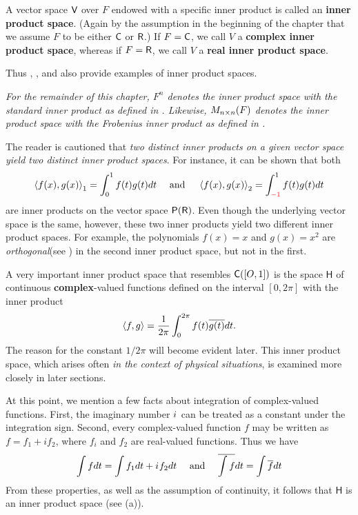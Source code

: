\begin{remark} \label{remark 6.1.6}
A vector space \(\textsf{V}\) over \(F\) endowed with a specific inner product is called an \textbf{inner product space}.
(Again by the assumption in the beginning of the chapter that we assume \(F\) to be either \(\textsf{C}\) or \(\textsf{R}\).)
If \(F = \textsf{C}\), we call \(V\) a \textbf{complex inner product space}, whereas if \(F = \textsf{R}\), we call \(V\) a \textbf{real inner product space}.

Thus , , and  also provide examples of inner product spaces.
\begin{center}\emph{
    For the remainder of this chapter, \(F^n\) denotes the inner product space \emph{with the standard inner product} as defined in .
Likewise, \(M_{n \times n}(F)\) denotes the inner product space with the Frobenius inner product as defined in .
}\end{center}
\end{remark}

\begin{remark} \label{remark 6.1.7}
The reader is cautioned that \emph{two distinct inner products on a given vector space yield two distinct inner product spaces}.
For instance, it can be shown that both
\[
    \LG f(x), g(x) \RG_1 = \int_0^1 f(t) g(t) d t
    \quad \text { and } \quad
    \LG f(x), g(x) \RG_{2} = \int_{\RED{-1}}^{1} f(t) g(t) d t
\]
are inner products on the vector space \(\textsf{P}(\textsf{R})\).
Even though the underlying vector space is the same, however, these two inner products yield two different inner product spaces.
For example, the polynomials \(f(x) = x\) and \(g(x) = x^2\) are \emph{orthogonal}(see ) in the second inner product space, but not in the first.
\end{remark}

\begin{remark} \label{remark 6.1.8}
A very important inner product space that resembles \(\textsf{C}([O, 1])\) is the space \(\textsf{H}\) of continuous \textbf{complex}-valued functions defined on the interval \([0, 2\pi]\) with the inner product
\[
    \left< f, g \right> = \frac{1}{2\pi} \int_0^{2\pi} f(t) \overline{g(t)} dt.
\]
The reason for the constant \(1/2\pi\) will become evident later.
This inner product space, which arises often \emph{in the context of physical situations}, is examined
more closely in later sections.

At this point, we mention a few facts about integration of complex-valued functions.
First, the imaginary number \({i\mkern1mu}\) can be treated as a constant under the integration sign.
Second, every complex-valued function \(f\) may be written as \(f = f_1 + i f_2\), where \(f_i\) and \(f_2\) are real-valued functions.
Thus we have
\[
    \int f dt = \int f_1 dt + {i\mkern1mu} f_2 dt \quad \text{ and } \quad \overline{\int f} dt = \int \overline{f} dt
\]
From these properties, as well as the assumption of continuity, it follows that \(\textsf{H}\) is an inner product space (see (a)).
\end{remark}

